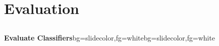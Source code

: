%

\section{Evaluation}
\subsection{}
\begin{frame}{}
\begin{variableblock}{\centering \Large \textbf{\vspace{4pt}\newline Evaluate Classifiers\vspace{4pt}}}{bg=slidecolor,fg=white}{bg=slidecolor,fg=white}
\end{variableblock}
\end{frame}



